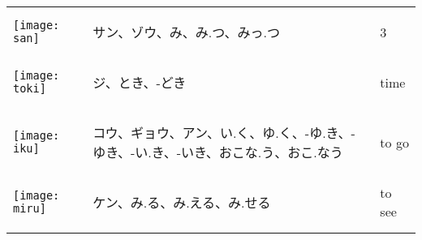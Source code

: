 \documentclass[a4paper,12pt]{extarticle}
\begin{document}
\begin{longtable}{|lp{6cm}p{4cm}|}
	\begin{minipage}{0.3\textwidth}
		\centerline{
			\texttt{[image: san]}
		}
	\end{minipage}
	                                   &
	\begin{CJK}{UTF8}{min}サン、ゾウ、み、み.つ、みっ.つ\end{CJK}
	                                   &
	3
	\\
	\begin{minipage}{0.3\textwidth}
		\centerline{
			\texttt{[image: toki]}
		}
	\end{minipage}
	                                   &
	\begin{CJK}{UTF8}{min}ジ、とき、-どき\end{CJK}
	                                   &
	time
	\\
	\begin{minipage}{0.3\textwidth}
		\centerline{
			\texttt{[image: iku]}
		}
	\end{minipage}
	                                   &
	\begin{CJK}{UTF8}{min}コウ、ギョウ、アン、い.く、ゆ.く、-ゆ.き、-ゆき、-い.き、-いき、おこな.う、おこ.なう\end{CJK}
	                                   &
	to go
	\\
	\begin{minipage}{0.3\textwidth}
		\centerline{
			\texttt{[image: miru]}
		}
	\end{minipage}
	                                   &
	\begin{CJK}{UTF8}{min}ケン、み.る、み.える、み.せる\end{CJK}
	                                   &
	to see
	\\
	\begin{minipage}{0.3\textwidth}

\end{minipage}
\end{longtable}
\end{document}
